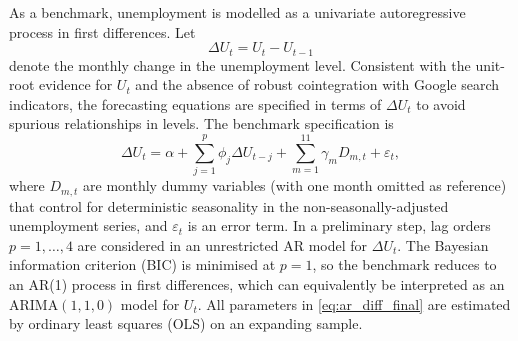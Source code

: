 \documentclass[12pt,a4paper]{article}
\begin{document}
As a benchmark, unemployment is modelled as a univariate autoregressive process in first differences. Let
\[
\Delta U_t = U_t - U_{t-1}
\]
denote the monthly change in the unemployment level. Consistent with the unit-root evidence for $U_t$ and the absence of robust cointegration with Google search indicators, the forecasting equations are specified in terms of $\Delta U_t$ to avoid spurious relationships in levels.
The benchmark specification is
\begin{equation}
\Delta U_t = \alpha + \sum_{j=1}^{p} \phi_j \Delta U_{t-j} + \sum_{m=1}^{11} \gamma_m D_{m,t} + \varepsilon_t,
\label{eq:ar_diff_final}
\end{equation}
where $D_{m,t}$ are monthly dummy variables (with one month omitted as reference) that control for deterministic seasonality in the non-seasonally-adjusted unemployment series, and $\varepsilon_t$ is an error term. In a preliminary step, lag orders $p = 1,\dots,4$ are considered in an unrestricted AR model for $\Delta U_t$. The Bayesian information criterion (BIC) is minimised at $p=1$, so the benchmark reduces to an AR(1) process in first differences, which can equivalently be interpreted as an ARIMA$(1,1,0)$ model for $U_t$.
All parameters in \eqref{eq:ar_diff_final} are estimated by ordinary least squares (OLS) on an expanding sample. 
\end{document}
